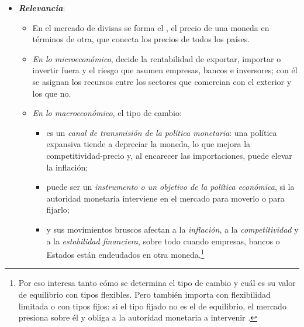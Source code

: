 \documentclass[11pt]{article}
\begin{document}
\begin{itemize}
\item \textbf{\emph{Relevancia}}:
  \begin{itemize}
  \item En el mercado de divisas se forma el , el precio de una moneda en términos de otra, que conecta los precios de todos los países.
  \item \emph{En lo microeconómico}, decide la rentabilidad de exportar, importar o invertir fuera y el riesgo que asumen empresas, bancos e inversores; con él se asignan los recursos entre los sectores que comercian con el exterior y los que no.
  \item \emph{En lo macroeconómico}, el tipo de cambio:
    \begin{itemize}
    \item es un \emph{canal de transmisión de la política monetaria}: una política expansiva tiende a depreciar la moneda, lo que mejora la competitividad-precio y, al encarecer las importaciones, puede elevar la inflación;
    \item puede ser un \emph{instrumento o un objetivo de la política económica}, si la autoridad monetaria interviene en el mercado para moverlo o para fijarlo;
    \item y sus movimientos bruscos afectan a la \emph{inflación}, a la \emph{competitividad} y a la \emph{estabilidad financiera}, sobre todo cuando empresas, bancos o Estados están endeudados en otra moneda.\footnote{Por eso interesa tanto cómo se determina el tipo de cambio y cuál es su valor de equilibrio con tipos flexibles. Pero también importa con flexibilidad limitada o con tipos fijos: si el tipo fijado no es el de equilibrio, el mercado presiona sobre él y obliga a la autoridad monetaria a intervenir .}
    \end{itemize}
  \end{itemize}


\end{itemize}
\end{document}
